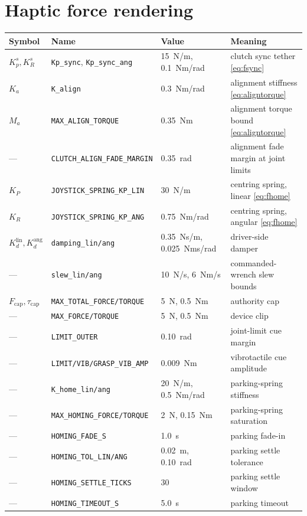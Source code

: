 \documentclass[12pt,a4paper,twoside,openright]{report}
\begin{document}
\section{Haptic force rendering}
\begin{tabularx}{\linewidth}{@{}lllX@{}}
\toprule
Symbol & Name & Value & Meaning \\
\midrule
$K_p^{s}, K_R^{s}$ & \texttt{Kp\_sync}, \texttt{Kp\_sync\_ang} & 15~N/m, 0.1~Nm/rad & clutch sync tether \eqref{eq:fsync} \\
$K_a$ & \texttt{K\_align} & 0.3~Nm/rad & alignment stiffness \eqref{eq:aligntorque} \\
$M_a$ & \texttt{MAX\_ALIGN\_TORQUE} & 0.35~Nm & alignment torque bound \eqref{eq:aligntorque} \\
--- & \texttt{CLUTCH\_ALIGN\_FADE\_MARGIN} & 0.35~rad & alignment fade margin at joint limits \\
$K_P$ & \texttt{JOYSTICK\_SPRING\_KP\_LIN} & 30~N/m & centring spring, linear \eqref{eq:fhome} \\
$K_R$ & \texttt{JOYSTICK\_SPRING\_KP\_ANG} & 0.75~Nm/rad & centring spring, angular \eqref{eq:fhome} \\
$K_d^{\text{lin}}, K_d^{\text{ang}}$ & \texttt{damping\_lin/ang} & 0.35~Ns/m, 0.025~Nms/rad & driver-side damper \\
--- & \texttt{slew\_lin/ang} & 10~N/s, 6~Nm/s & commanded-wrench slew bounds \\
$F_{\text{cap}}, \tau_{\text{cap}}$ & \texttt{MAX\_TOTAL\_FORCE/TORQUE} & 5~N, 0.5~Nm & authority cap \\
--- & \texttt{MAX\_FORCE/TORQUE} & 5~N, 0.5~Nm & device clip \\
--- & \texttt{LIMIT\_OUTER} & 0.10~rad & joint-limit cue margin \\
--- & \texttt{LIMIT/VIB/GRASP\_VIB\_AMP} & 0.009~Nm & vibrotactile cue amplitude \\
--- & \texttt{K\_home\_lin/ang} & 20~N/m, 0.5~Nm/rad & parking-spring stiffness \\
--- & \texttt{MAX\_HOMING\_FORCE/TORQUE} & 2~N, 0.15~Nm & parking-spring saturation \\
--- & \texttt{HOMING\_FADE\_S} & 1.0~s & parking fade-in \\
--- & \texttt{HOMING\_TOL\_LIN/ANG} & 0.02~m, 0.10~rad & parking settle tolerance \\
--- & \texttt{HOMING\_SETTLE\_TICKS} & 30 & parking settle window \\
--- & \texttt{HOMING\_TIMEOUT\_S} & 5.0~s & parking timeout \\
\bottomrule
\end{tabularx}
\end{document}
